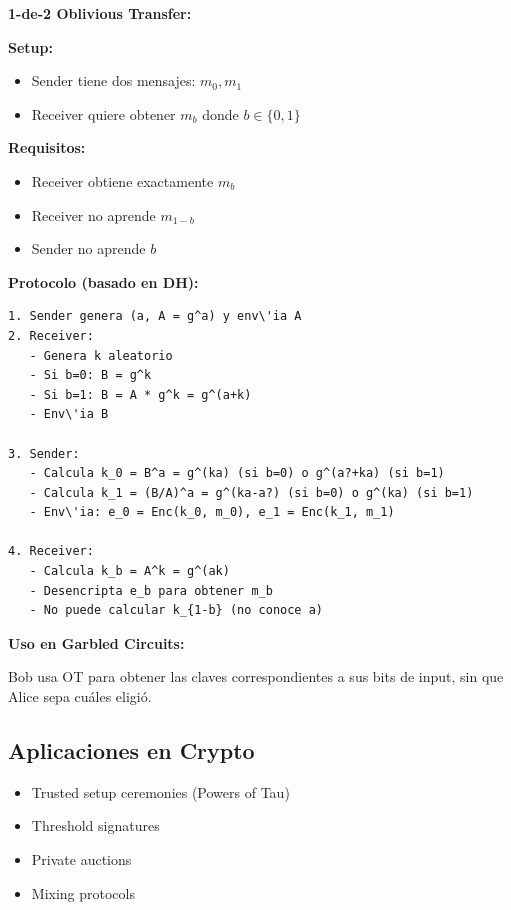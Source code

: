 \documentclass[11pt,a4paper,twoside]{book}
\begin{document}
\begin{mathnote}
\textbf{1-de-2 Oblivious Transfer:}

\textbf{Setup:}
\begin{itemize}
    \item Sender tiene dos mensajes: $m_0, m_1$
    \item Receiver quiere obtener $m_b$ donde $b \in \{0, 1\}$
\end{itemize}

\textbf{Requisitos:}
\begin{itemize}
    \item Receiver obtiene exactamente $m_b$
    \item Receiver no aprende $m_{1-b}$
    \item Sender no aprende $b$
\end{itemize}

\textbf{Protocolo (basado en DH):}
\begin{verbatim}
1. Sender genera (a, A = g^a) y env\'ia A
2. Receiver:
   - Genera k aleatorio
   - Si b=0: B = g^k
   - Si b=1: B = A * g^k = g^(a+k)
   - Env\'ia B

3. Sender:
   - Calcula k_0 = B^a = g^(ka) (si b=0) o g^(a?+ka) (si b=1)
   - Calcula k_1 = (B/A)^a = g^(ka-a?) (si b=0) o g^(ka) (si b=1)
   - Env\'ia: e_0 = Enc(k_0, m_0), e_1 = Enc(k_1, m_1)

4. Receiver:
   - Calcula k_b = A^k = g^(ak)
   - Desencripta e_b para obtener m_b
   - No puede calcular k_{1-b} (no conoce a)
\end{verbatim}

\textbf{Uso en Garbled Circuits:}

Bob usa OT para obtener las claves correspondientes a sus bits de input, sin que Alice sepa cu\'ales eligi\'o.
\end{mathnote}

\subsection{Aplicaciones en Crypto}

\begin{itemize}
    \item Trusted setup ceremonies (Powers of Tau)
    \item Threshold signatures
    \item Private auctions
    \item Mixing protocols
\end{itemize}
\end{document}
